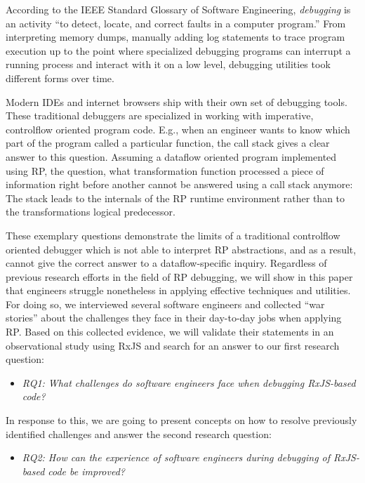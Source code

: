 \documentclass[sigplan,screen,review]{acmart}
\begin{document}
According to the IEEE Standard Glossary of Software Engineering, \emph{debugging} is an activity ``to detect, locate, and correct faults in a computer program.''\cite{ieeeglossary} From interpreting memory dumps, manually adding log statements to trace program execution up to the point where specialized debugging programs can interrupt a running process and interact with it on a low level, debugging utilities took different forms over time.

Modern IDEs and internet browsers ship with their own set of debugging tools. These traditional debuggers are specialized in working with imperative, controlflow oriented program code. E.g., when an engineer wants to know which part of the program called a particular function, the call stack gives a clear answer to this question. Assuming a dataflow oriented program implemented using RP, the question, what transformation function processed a piece of information right before another cannot be answered using a call stack anymore: The stack leads to the internals of the RP runtime environment rather than to the transformations logical predecessor.

These exemplary questions demonstrate the limits of a traditional controlflow oriented debugger which is not able to interpret RP abstractions, and as a result, cannot give the correct answer to a dataflow-specific inquiry. Regardless of previous research efforts \cite{10.1145/2577080.2577083} \cite{10.1145/2884781.2884815} \cite{10.1145/3180155.3180156} in the field of RP debugging, we will show in this paper that engineers struggle nonetheless in applying effective techniques and utilities. For doing so, we interviewed several software engineers and collected ``war stories'' about the challenges they face in their day-to-day jobs when applying RP. Based on this collected evidence, we will validate their statements in an observational study using RxJS and search for an answer to our first research question:

\begin{itemize}
	\item \emph{RQ1: What challenges do software engineers face when debugging RxJS-based code?}
\end{itemize}

In response to this, we are going to present concepts on how to resolve previously identified challenges and answer the second research question:

\begin{itemize}
	\item \emph{RQ2: How can the experience of software engineers during debugging of RxJS-based code be improved?}
\end{itemize}
\end{document}
